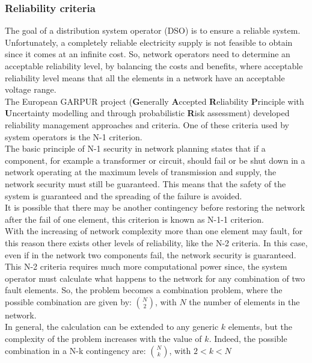 \subsubsection{Reliability criteria}
\label{ssec:n1cri}
The goal of a distribution system operator (\gls{DSO}) is to ensure a reliable system. Unfortunately, a completely reliable electricity supply is not feasible to obtain since it comes at an infinite cost. So, network operators need to determine an acceptable reliability level, by balancing the costs and benefits, where acceptable reliability level means that all the elements in a network have an acceptable voltage range. \\

The European \gls{GARPUR} project (\textbf{G}enerally \textbf{A}ccepted \textbf{R}eliability \textbf{P}rinciple with \textbf{U}ncertainty modelling and through probabilistic \textbf{R}isk assessment) developed reliability management approaches and criteria. One of these criteria used by system operators is the N-1 criterion. \\

The basic principle of N-1 security in network planning states that if a component, for example a transformer or circuit, should fail or be shut down in a network operating at the maximum levels of transmission and supply, the network security must still be guaranteed. This means that the safety of the system is guaranteed and the spreading of the failure is avoided. \\
It is possible that there may be another contingency before restoring the network after the fail of one element, this criterion is known as N-1-1 criterion.  \\

With the increasing of network complexity more than one element may fault, for this reason there exists other levels of reliability, like the N-2 criteria. In this case, even if in the network two components fail, the network security is guaranteed. \\
This N-2 criteria requires much more computational power since, the system operator must calculate what happens to the network for any combination of two fault elements. So, the problem becomes a combination problem, where the possible combination are given by: $N \choose 2$, with $N$ the number of elements in the network. \\

In general, the calculation can be extended to any generic $k$ elements, but the complexity of the problem increases with the value of $k$. Indeed, the possible combination in a N-k contingency are: $N \choose k$, with $2 < k < N$

